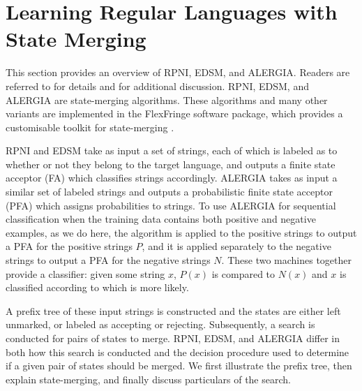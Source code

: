 \documentclass[twoside,11pt]{article}
\begin{document}
\section{Learning Regular Languages with State Merging} \label{sec:bg}

This section provides an overview of RPNI, EDSM, and ALERGIA.
Readers are referred to \citet{Higuera2010} for details and \citet{Heinz-delaHiguera-vanZaanen-GICL} for additional discussion. RPNI, EDSM, and ALERGIA are state-merging algorithms. These algorithms and many other variants are implemented in the FlexFringe software package, which provides a customisable toolkit for state-merging \citep{flexfringe,flexfringe-short}.

RPNI and EDSM take as input a set of strings, each of which is labeled as to whether or not they belong to the target language, and outputs a finite state acceptor (FA) which classifies strings accordingly.
ALERGIA takes as input a similar set of labeled strings and outputs a probabilistic finite state acceptor (PFA) which assigns probabilities to strings.
To use ALERGIA for sequential classification when the training data contains both positive and negative examples, as we do here, the algorithm is applied to the positive strings to output a PFA for the positive strings $P$, and it is applied separately to the negative strings to output a PFA for the negative strings $N$.
These two machines together provide a classifier: given some string $x$, $P(x)$ is compared to $N(x)$ and $x$ is classified according to which is more likely.

A prefix tree of these input strings is constructed and the states are either left unmarked, or labeled as accepting or rejecting.
Subsequently, a search is conducted for pairs of states to merge.
RPNI, EDSM, and ALERGIA differ in both how this search is conducted and the decision procedure used to determine if a given pair of states should be merged.
We first illustrate the prefix tree, then explain state-merging, and finally discuss particulars of the search.
\end{document}
